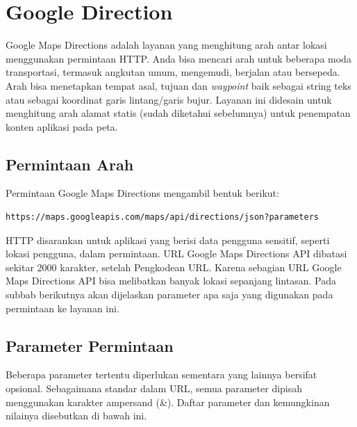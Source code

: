 \section{Google Direction}
\label{sec:googledirapi}

Google Maps Directions adalah layanan yang menghitung arah antar lokasi menggunakan permintaan HTTP\cite{ankurkotwal2017}. Anda bisa mencari arah untuk beberapa moda transportasi, termasuk angkutan umum, mengemudi, berjalan atau bersepeda. Arah bisa menetapkan tempat asal, tujuan dan \textit{waypoint} baik sebagai string teks atau sebagai koordinat garis lintang/garis bujur. Layanan ini didesain untuk menghitung arah alamat statis (sudah diketahui sebelumnya) untuk penempatan konten aplikasi pada peta.

\subsection{Permintaan Arah}
\label{subsec:permintaanarahgoogledir}

Permintaan Google Maps Directions mengambil bentuk berikut:

\begin{lstlisting}[caption= \textit{Request} Google Directions\cite{ankurkotwal2017}, captionpos=b]
https://maps.googleapis.com/maps/api/directions/json?parameters
\end{lstlisting}

HTTP disarankan untuk aplikasi yang berisi data pengguna sensitif, seperti lokasi pengguna, dalam permintaan. URL Google Maps Directions API dibatasi sekitar 2000 karakter, setelah Pengkodean URL. Karena sebagian URL Google Maps Directions API bisa melibatkan banyak lokasi sepanjang lintasan. Pada subbab berikutnya akan dijelaskan parameter apa saja yang digunakan pada permintaan ke layanan ini.

\subsection{Parameter Permintaan}
\label{subsec:parameterpermintaangoogledir}

Beberapa parameter tertentu diperlukan sementara yang lainnya bersifat opsional. Sebagaimana standar dalam URL, semua parameter dipisah menggunakan karakter ampersand (\&). Daftar parameter dan kemungkinan nilainya disebutkan di bawah ini\cite{ankurkotwal2017}.

